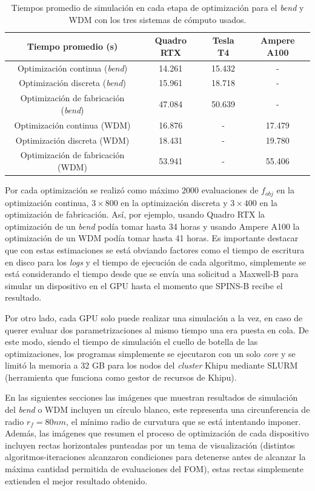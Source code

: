 \begin{table}[ht]
    \centering
    \begin{tabular}{|c|c|c|c|}
    \hline 
      Tiempo promedio (s) &  Quadro RTX & Tesla T4 & Ampere A100 \\
    \hline 
      Optimización continua (\emph{bend})            & 14.261 & 15.432 & - \\
      Optimización discreta (\emph{bend})            & 15.961 & 18.718 & - \\
      Optimización de fabricación (\emph{bend})      & 47.084 & 50.639 & - \\
      Optimización continua (WDM)                    & 16.876 & - & 17.479 \\
      Optimización discreta (WDM)                    & 18.431 & - & 19.780 \\
      Optimización de fabricación (WDM)              & 53.941 & - & 55.406 \\
    \hline 
    \end{tabular}
    \caption{Tiempos promedio de simulación en cada etapa de optimización para el \emph{bend} y WDM con los
    tres sistemas de cómputo usados.}
    \label{tab:times}
\end{table}

Por cada optimización se realizó como máximo $2000$ evaluaciones de $f_{obj}$ en la optimización continua,
$3 \times 800$ en la optimización discreta y $3 \times 400$ en la optimización de fabricación.
Así, por ejemplo, usando Quadro RTX la optimización de un \emph{bend} podía tomar hasta 34 horas
y usando Ampere A100 la optimización de un WDM podía tomar hasta 41 horas.
Es importante destacar que con estas estimaciones se está obviando factores como
el tiempo de escritura en disco para los \emph{logs} y 
el tiempo de ejecución de cada algoritmo, simplemente se está considerando
el tiempo desde que se envía una solicitud a Maxwell-B para simular un dispositivo en el GPU
hasta el momento que SPINS-B recibe el resultado.

Por otro lado, cada GPU solo puede realizar una simulación a la vez, en caso de querer 
evaluar dos parametrizaciones al mismo tiempo una era puesta en cola. De este modo,
siendo el tiempo de simulación el cuello de botella de las optimizaciones, los programas simplemente
se ejecutaron con un solo \emph{core} y se limitó la memoria a 32 GB para los nodos del \emph{cluster}
Khipu mediante SLURM (herramienta que funciona como gestor de recursos de Khipu).


En las siguientes secciones las imágenes que muestran resultados de simulación del \emph{bend} o WDM
incluyen un círculo blanco, este representa una circunferencia de radio $r_f = 80 nm$,
el mínimo radio de curvatura que se está intentando imponer.
Además, las imágenes que resumen el proceso de optimización de cada dispositivo incluyen
rectas horizontales punteadas por un tema de visualización (distintos algoritmos-iteraciones
alcanzaron condiciones para detenerse antes de alcanzar la máxima cantidad permitida de
evaluaciones del FOM), estas rectas simplemente extienden el mejor resultado obtenido.

